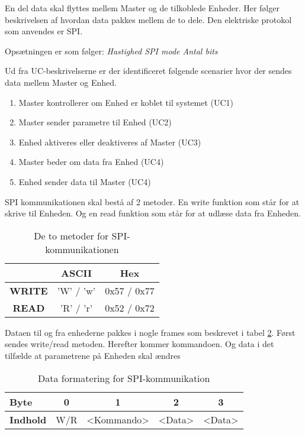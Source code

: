 
En del data skal flyttes mellem Master og de tilkoblede Enheder. Her følger beskrivelsen af hvordan data pakkes mellem de to dele. Den elektriske protokol som anvendes er SPI.

Opsætningen er som følger:
\textit{Hastighed
SPI mode
Antal bits}

Ud fra UC-beskrivelserne er der identificeret følgende scenarier hvor der sendes data mellem Master og Enhed.

\begin{enumerate}
	\item Master kontrollerer om Enhed er koblet til systemet (UC1)
	\item Master sender parametre til Enhed (UC2)
	\item Enhed aktiveres eller deaktiveres af Master (UC3)
	\item Master beder om data fra Enhed (UC4)
	\item Enhed sender data til Master (UC4)
\end{enumerate}


SPI kommunikationen skal bestå af 2 metoder. En write funktion som står for at skrive til Enheden. Og en read funktion som står for at udlæse data fra Enheden.

\begin{table}[h]
	\caption{De to metoder for SPI-kommunikationen}
	\centering
	\begin{tabular}{|c|c|c|}
		\hline 
		& \textbf{ASCII} & \textbf{Hex} \\ 
		\hline 
		\textbf{WRITE} & 'W' / 'w' & 0x57 / 0x77 \\ 
		\hline 
		\textbf{READ} & 'R' / 'r' & 0x52 / 0x72 \\ 
		\hline 
	\end{tabular} 
	\label{table:SWProtokol-write-read}
\end{table}


Dataen til og fra enhederne pakkes i nogle frames som beskrevet i tabel \ref{table:SWProtokol-frames}. Først sendes write/read metoden. Herefter kommer kommandoen. Og data i det tilfælde at parametrene på Enheden skal ændres

\begin{table}[h]
	\caption{Data formatering for SPI-kommunikation}
	\centering
	\begin{tabular}{|l|c|c|c|c|}
		\hline 
		\textbf{Byte} & 0 & 1 & 2 & 3  \\ 
		\hline 
		\textbf{Indhold} & W/R & <Kommando> & <Data> & <Data>  \\ 
		\hline 
	\end{tabular} 
	\label{table:SWProtokol-frames}
\end{table}

